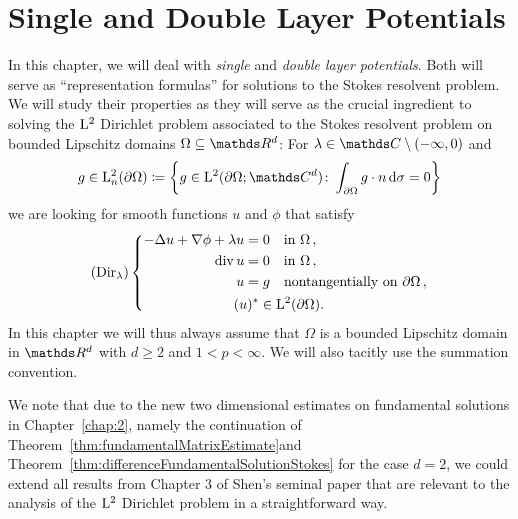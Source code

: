 \chapter{Single and Double Layer Potentials}
\label{chap:3}

In this chapter, we will deal with \emph{single} and \emph{double layer potentials}.
Both will serve as ``representation formulas'' for solutions to the Stokes resolvent problem.
We will study their properties as they will serve as the crucial ingredient to solving the $\mathrm{L}^2$ Dirichlet problem associated to the Stokes resolvent problem on bounded Lipschitz domains $\Omega \subseteq \R^d$:
For $\lambda \in \C \setminus (-\infty,0)$ and
\begin{align*}
  g \in \Ell^2_n(\partial\Omega) \coloneqq \bigg\{g \in \Ell^2(\partial\Omega; \C^d) \colon \int_{\partial\Omega} g \cdot n \d \sigma = 0\bigg\}
\end{align*}
we are looking for smooth functions $u$ and $\phi$ that satisfy
{
  \label{eq:dirProblem}
\begin{align*}
  (\mathrm{Dir}_\lambda)
  \left\{
  \begin{alignedat}{1}
    -\Delta u + \nabla \phi + \lambda u =&\; 0 \quad\text{in }\Omega\,, \\
    \mathrm{div\,} u =&\; 0 \quad\text{in } \Omega\,, \\ 
    u =&\; g  \quad\text{nontangentially on } \partial\Omega\,, \\
    (u)^* &\in \mathrm{L}^2(\partial\Omega).
  \end{alignedat}
    \right.
\end{align*}
}
In this chapter we will thus always assume that $\Omega$ is a bounded Lipschitz domain in $\R^d$ with $d \geq 2$ and $1 < p < \infty$.
We will also tacitly use the summation convention.

We note that due to the new two dimensional estimates on fundamental solutions in Chapter~\ref{chap:2}, namely the continuation of  Theorem~\ref{thm:fundamentalMatrixEstimate}and Theorem~\ref{thm:differenceFundamentalSolutionStokes} for the case $d=2$, we could extend all results from Chapter 3 of Shen's seminal paper \cite{Shen2012} that are relevant to the analysis of the $\mathrm{L}^2$ Dirichlet problem in a straightforward way.


